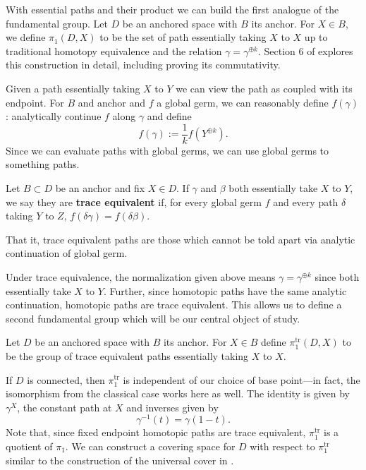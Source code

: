 With essential paths and their product we can build the first analogue of the
fundamental group. Let \(D\) be an anchored space with \(B\) its anchor. For
\(X \in B\), we define \(\pi_1(D,X)\) to be the set of path essentially taking
\(X\) to \(X\) up to traditional homotopy equivalence and the relation
\(\gamma=\gamma^{\oplus k}\). Section 6 of
\cite{pascoeFreeNoncommutativePrincipal2020} explores this construction in
detail, including proving its commutativity.

Given a path essentially taking \(X\) to \(Y\) we can view the path as coupled
with its endpoint. For \(B\) and anchor and \(f\) a global germ, we can
reasonably define \(f(\gamma)\): analytically continue \(f\) along \(\gamma\) and define
\[
  f(\gamma) := \frac{1}{k} f(Y^{\oplus k}).
\]
Since we can evaluate paths with global germs, we can use global germs to
{\color{green} something} paths.

\begin{definition}
\label{def:label}
  Let \(B \subset D\) be an anchor and fix \(X \in D\). If \(\gamma\) and
  \(\beta\) both essentially take \(X\) to \(Y\), we say they are
  \textbf{trace equivalent} if, for every global germ \(f\) and every path
  \(\delta\) taking \(Y\) to \(Z\), \(f(\delta\gamma)=f(\delta\beta)\).

  That it, trace equivalent paths are those which cannot be told apart via
  analytic continuation of global germ.
\end{definition}

Under trace equivalence, the normalization given above means
\(\gamma = \gamma^{\oplus k}\) since both essentially take \(X\) to \(Y\).
Further, since homotopic paths have the same analytic continuation, homotopic
paths are trace equivalent. This allows us to define a second fundamental group
which will be our central object of study.
\begin{definition}%
\label{def:trpi1}
 Let \(D\) be an anchored space with \(B\) its anchor. For \(X \in B\) define
 \(\pi_1^{\textrm{tr}}(D,X)\) to be the group of trace equivalent paths
 essentially taking \(X\) to \(X\).
\end{definition}
If \(D\) is connected, then \(\pi_1^{\textrm{tr}}\) is independent of our
choice of base point---in fact, the isomorphism from the classical case
{\color{green} works here as well}. The identity is given by \(\gamma^X\), the
constant path at \(X\) and inverses given by
\[
  \gamma ^{-1}(t) = \gamma (1-t).
\]
Note that, since fixed endpoint homotopic paths are trace equivalent,
\(\pi_1^{\textrm{tr}}\) is a quotient of \(\pi_1\). We can construct a covering
space for \(D\) with respect to \(\pi_1^{\textrm{tr}}\) similar to the
construction of the universal cover in \cite{hatcherAlgebraic2002}.


